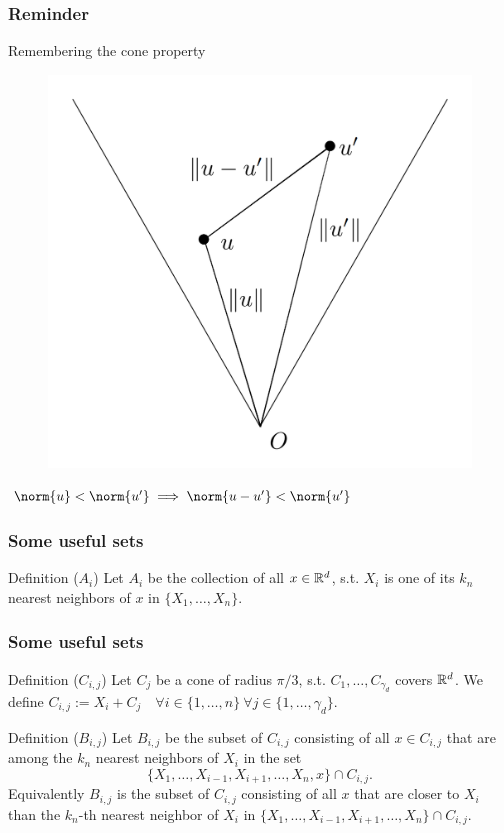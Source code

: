 \begin{frame}
\frametitle{Reminder}
Remembering the cone property
\begin{figure}
    \includegraphics[scale=0.2]{cone_property.png}
    \centering
\end{figure}
\(\norm{u} < \norm{u'} \implies \norm{u - u'} < \norm{u'}\)
\end{frame}

\begin{frame}
\frametitle{Some useful sets}
\begin{block}{Definition ($A_i$)}
Let \(A_i\) be the collection of all \(x \in \mathbb{R}^d\), s.t. \(X_i\) is one of its \(k_n\) nearest neighbors of \(x\) in \(\{X_1, \ldots, X_n\}\).
\end{block}
\end{frame}

\begin{frame}
\frametitle{Some useful sets}
\begin{block}{Definition ($C_{i, j}$)}
Let \(C_j\) be a cone of radius \(\pi/3\), s.t. \(C_1, \ldots, C_{\gamma_d}\) covers \(\mathbb{R}^d\).
We define \(C_{i, j} := X_i + C_j \quad \forall i \in \{1, \ldots, n\} \ \forall j \in \{1, \ldots, \gamma_d\}\).
\end{block}

\begin{block}{Definition ($B_{i, j}$)}
Let \(B_{i, j}\) be the subset of \(C_{i, j}\) consisting of all \(x \in C_{i, j}\) that are among the \(k_n\) nearest neighbors of \(X_i\) in the set
    \[
        \{X_1, \ldots, X_{i-1},X_{i+1}, \ldots, X_n, x\} \cap C_{i, j}. 
    \]
    Equivalently \(B_{i, j}\) is the subset of \(C_{i, j}\) consisting of all \(x\) that are closer to \(X_i\) than the \(k_n\)-th nearest neighbor of \(X_i\) in \(\{X_1, \ldots, X_{i-1}, X_{i+1}, \ldots, X_n\} \cap C_{i, j}\).
\end{block}
\end{frame}


